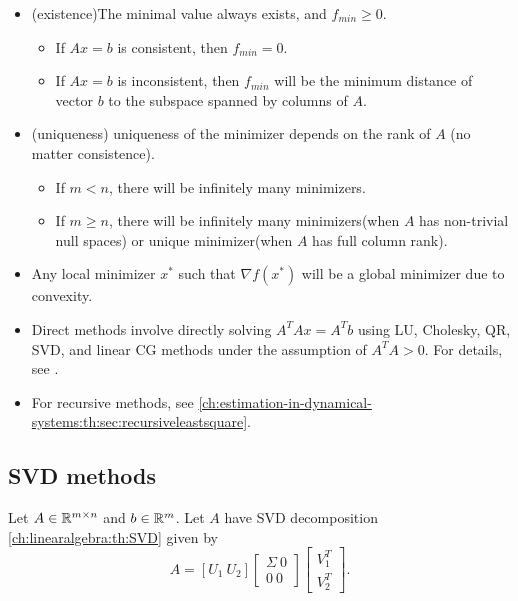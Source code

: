 \begin{refsection}
\begin{remark}
\begin{itemize}
	\item (existence)The minimal value always exists, and $f_{min} \geq 0$.
	\begin{itemize}
		\item If $Ax = b$ is consistent, then $f_{min} = 0$.
		\item If $Ax = b$ is inconsistent, then $f_{min}$ will be the minimum distance of vector $b$ to the subspace spanned by columns of $A$.
	\end{itemize}
	\item (uniqueness) uniqueness of the minimizer depends on the rank of $A$ (no matter consistence).
	\begin{itemize}
		\item If $m < n$, there will be infinitely many minimizers.
		\item If $m\geq n$, there will be infinitely many minimizers(when $A$ has non-trivial null spaces) or unique minimizer(when $A$ has full column rank). 
	\end{itemize}
	\item Any local minimizer $x^*$ such that $\nabla f(x^*)$ will be a global minimizer due to convexity.
\end{itemize}
\end{remark}



\begin{remark}\hfill
	\begin{itemize}
		\item Direct methods involve directly solving $A^TAx = A^Tb$ using LU, Cholesky, QR, SVD, and linear CG methods under the assumption of $A^TA>0$. For details, see \cite{Robinson2015nonlinear}. 
		\item For recursive methods, see \autoref{ch:estimation-in-dynamical-systems:th:sec:recursiveleastsquare}.
	\end{itemize}	
\end{remark}


\subsection{SVD methods}

\begin{lemma}
	Let $A\in \mathbb{R}^{m\times n}$  and $b\in \mathbb{R}^m$. Let $A$ have SVD decomposition \autoref{ch:linearalgebra:th:SVD} given by
	$$
	A = [U_1 ~ U_2]\begin{bmatrix}
	\Sigma ~ 0\\
	0 ~ 0
	\end{bmatrix} \begin{bmatrix}
	V_1^T\\
	V_2^T
	\end{bmatrix} 
	.$$
	

\end{lemma}
\end{refsection}
